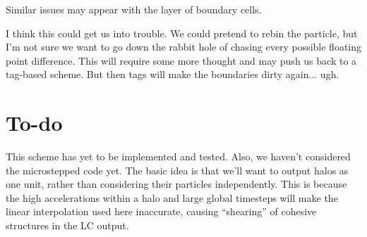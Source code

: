 \documentclass[a4paper]{article}
\begin{document}
Similar issues may appear with the layer of boundary cells.

I think this could get us into trouble.  We could pretend to rebin the particle, but I'm not sure we want to go down the rabbit hole of chasing every possible floating point difference.  This will require some more thought and may push us back to a tag-based scheme.  But then tags will make the boundaries dirty again... ugh.


\section{To-do}
This scheme has yet to be implemented and tested.  Also, we haven't considered the microstepped code yet.  The basic idea is that we'll want to output halos as one unit, rather than considering their particles independently.  This is because the high accelerations within a halo and large global timesteps will make the linear interpolation used here inaccurate, causing ``shearing'' of cohesive structures in the LC output.
\end{document}
